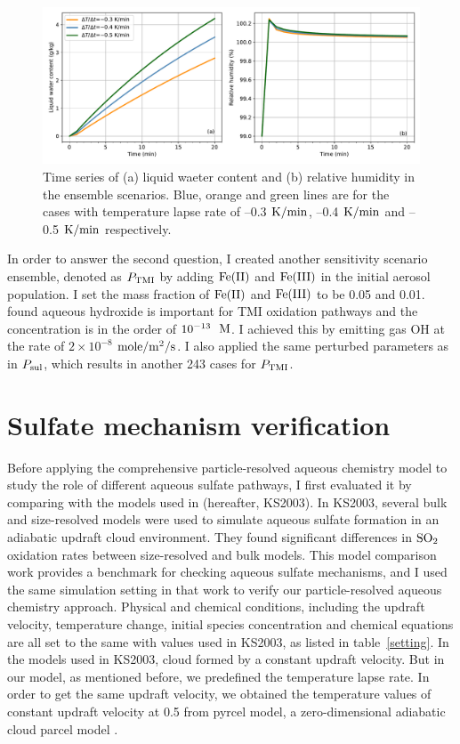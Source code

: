 \documentclass[edeposit,fullpage]{uiucthesis2009}
\makeatletter
\DeclareRobustCommand*\unit[1]
 {\ensuremath{%
   {\thinmuskip3mu\relax
    \def\mu{\text{\textmu}}\def~{\,}%
    \ifx\f@series\testbx\mathbf{#1}\else\mathrm{#1}\fi}}}
\makeatother
\begin{document}
\begin{figure}[ht]
    \centering \includegraphics[scale=0.55]{chap2_figs/chap2_mono_lwc_rh.pdf}
    \caption{Time series of (a) liquid waeter content and (b) relative humidity in the ensemble scenarios. Blue, orange and green lines are for the cases with temperature lapse rate of --0.3 \unit{K/min}, --0.4 \unit{K/min} and --0.5 \unit{K/min} respectively.}
    \label{chap2:ensemrh}
\end{figure}

In order to answer the second question, I created another sensitivity scenario ensemble, denoted as $P_{\rm TMI}$ by adding $\rm Fe(II)$ and $\rm Fe(III)$ in the initial aerosol population. I set the mass fraction of $\rm Fe(II)$ and $\rm Fe(III)$ to be 0.05 and 0.01. \citet{deguillaume2004role} found aqueous hydroxide is important for TMI oxidation pathways and the concentration is in the order of $\rm 10^{-13}$~\unit{M}. I achieved this by emitting gas OH at the rate of $2\times 10^{-8}$ \unit{mole/m^2/s}. I also applied the same perturbed parameters as in $P_{\rm sul}$, which results in another 243 cases for $P_{\rm TMI}$. 

\section{Sulfate mechanism verification}
\label{chap2.3}
Before applying the comprehensive particle-resolved aqueous chemistry model to study the role of different aqueous sulfate pathways, I first evaluated it by comparing with the models used in \cite{kreidenweis2003modification}(hereafter, KS2003). In KS2003, several bulk and size-resolved models were used to simulate aqueous sulfate formation in an adiabatic updraft cloud environment. They found significant differences in $\rm SO_2$ oxidation rates between size-resolved and bulk models. This model comparison work provides a benchmark for checking aqueous sulfate mechanisms, and I used the same simulation setting in that work to verify our particle-resolved aqueous chemistry approach. Physical and chemical conditions, including the updraft velocity, temperature change, initial species concentration and chemical equations are all set to the same with values used in KS2003, as listed in table~\ref{setting}. In the models used in KS2003, cloud formed by a constant updraft velocity. But in our model, as mentioned before, we predefined the temperature lapse rate. In order to get the same updraft velocity, we obtained the temperature values of constant updraft velocity at 0.5 from pyrcel model, a zero-dimensional adiabatic cloud parcel model \citep{rothenberg2016metamodeling}. 
\end{document}
